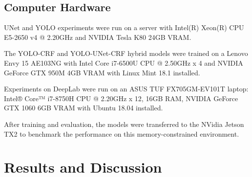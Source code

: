 \documentclass[10pt, journal, compsoc]{IEEEtran}
\begin{document}
\subsection{Computer Hardware}
UNet and YOLO experiments were run on a server with Intel(R) Xeon(R) CPU E5-2650 v4 @ 2.20GHz and NVIDIA Tesla K80 24GB VRAM.

The YOLO-CRF and YOLO-UNet-CRF hybrid models were trained on a Lenovo Envy 15 AE103NG with Intel Core i7-6500U CPU @ 2.50GHz x 4 and NVIDIA GeForce GTX 950M 4GB VRAM with Linux Mint 18.1 installed.

Experiments on DeepLab were run on an ASUS TUF FX705GM-EV101T laptop: Intel® Core™ i7-8750H CPU @ 2.20GHz x 12, 16GB RAM, NVIDIA GeForce GTX 1060 6GB VRAM with Ubuntu 18.04 installed.

After training and evaluation, the models were transferred to the NVidia Jetson TX2 to benchmark the performance on this memory-constrained environment.
\section{Results and Discussion}
\end{document}
